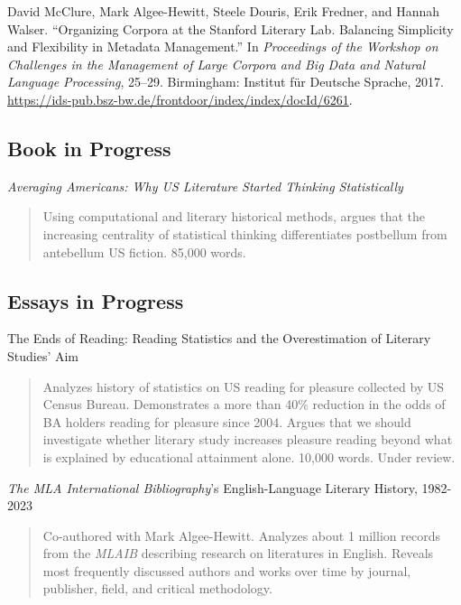 \documentclass[
  12pt,
  letterpaper,
]{article}
\newlength{\cslhangindent}
\newlength{\cslentryspacingunit} %
\newenvironment{CSLReferences}[2] %
 {%
  \setlength{\parindent}{0pt}
  \ifodd #1
  \let\oldpar\par
  \def\par{\hangindent=\cslhangindent\oldpar}
  \fi
  \setlength{\parskip}{#2\cslentryspacingunit}
 }%
 {}
\begin{document}
\begin{CSLReferences}{1}{0}
\leavevmode{}%
David McClure, Mark Algee-Hewitt, Steele Douris, Erik Fredner, and
Hannah Walser. {``Organizing Corpora at the {Stanford Literary Lab}.
{Balancing} Simplicity and Flexibility in Metadata Management.''} In
\emph{Proceedings of the {Workshop} on {Challenges} in the {Management}
of {Large Corpora} and {Big Data} and {Natural Language Processing}},
25--29. {Birmingham}: {Institut für Deutsche Sprache}, 2017.
\url{https://ids-pub.bsz-bw.de/frontdoor/index/index/docId/6261}.

\end{CSLReferences}

\hypertarget{book}{%
\subsection{Book in Progress}\label{book}}

\emph{Averaging Americans: Why US Literature Started Thinking Statistically}\\
\vspace{-1.5\baselineskip}
\begin{quote}
  Using computational and literary historical methods, argues that the increasing centrality of statistical thinking differentiates postbellum from antebellum US fiction. 85,000 words.
\end{quote}

\hypertarget{wip}{%
\subsection{Essays in Progress}\label{wip}}

The Ends of Reading: Reading Statistics and the Overestimation of Literary Studies' Aim\\
\vspace{-1.5\baselineskip}
\begin{quote}
  Analyzes history of statistics on US reading for pleasure collected by US Census Bureau. Demonstrates a more than 40\% reduction in the odds of BA holders reading for pleasure since 2004. Argues that we should investigate whether literary study increases pleasure reading beyond what is explained by educational attainment alone. 10,000 words. Under review.
\end{quote}

\emph{The MLA International Bibliography}'s English-Language Literary History, 1982-2023\\
\vspace{-1.5\baselineskip}
\begin{quote}
  Co-authored with Mark Algee-Hewitt. Analyzes about 1 million records from the \emph{MLAIB} describing research on literatures in English. Reveals most frequently discussed authors and works over time by journal, publisher, field, and critical methodology.
\end{quote}
\end{document}
